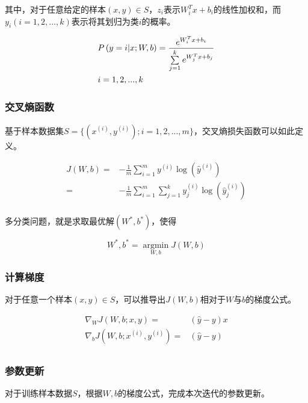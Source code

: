 \begin{content}
\begin{content}
其中，对于任意给定的样本$ (x, y) \in S $，$ z_i $表示$W_i^Tx+b_i$的线性加权和，而$y_i(i=1,2,...,k)$表示将其划归为类$i$的概率。

\[\begin{gathered}
  P\left( {y = i|x;W,b} \right) = \frac{{{e^{W_i^Tx + b_i}}}}{{\sum\limits_{j = 1}^k {{e^{W_j^Tx + b_j}}} }} \hfill \\
  i = 1,2,...,k \hfill \\ 
\end{gathered} \]


\subsubsection{交叉熵函数}

基于样本数据集$ S = \{ ({x^{(i)}},{y^{(i)}});i = 1,2,...,m\} $，交叉熵损失函数可以如此定义。

\[\begin{aligned}
  J(W,b) =  &  - \frac{1}{m}\sum\limits_{i = 1}^m {{y^{(i)}}\log \left( {{{\widehat y}^{(i)}}} \right)}  \\ 
   =  &  - \frac{1}{m}\sum\limits_{i = 1}^m {\sum\limits_{j = 1}^k {y_j^{(i)}\log \left( {\widehat y_j^{(i)}} \right)} }  \\
\end{aligned} \]

多分类问题，就是求取最优解$(W^*,b^*)$，使得

\[W^*,b^* = \mathop {\arg \min }\limits_{W,b} J(W,b)\]

\subsubsection{计算梯度}

对于任意一个样本$ (x,y) \in S $，可以推导出$ J(W,b) $相对于$ W $与$ b $的梯度公式。

\[\begin{aligned}
  {\nabla _W}J\left( {W,b;x,y} \right) =  & \left( {\widehat y - y} \right)x \\ 
  {\nabla _b}J\left( {W,b;{x^{(i)}},{y^{(i)}}} \right) =  & \left( {\widehat y - y} \right) \\ 
\end{aligned} \]


\subsubsection{参数更新}

对于训练样本数据$ S $，根据$W, b$的梯度公式，完成本次迭代的参数更新。


\end{content}
\end{content}
